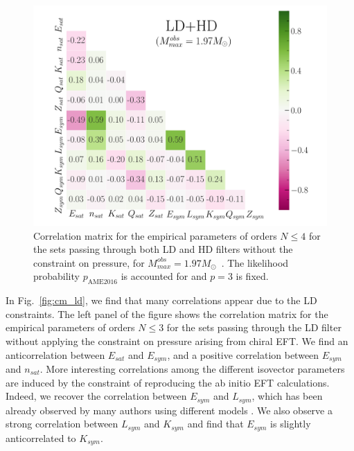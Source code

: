 \begin{figure}[!t]
\begin{center}
  \includegraphics[width=0.9\linewidth]{figures/cm_ldhd.pdf}
\end{center}
\caption[Correlations among empirical parameters for the sets passing through
both low-density and high-density filters]{Correlation matrix for the empirical 
  parameters of orders $N \leq 4$ for the sets passing through both LD and HD 
  filters without the constraint on pressure, for 
  $M_{max}^{obs}=1.97M_\odot$~\cite{Antoniadis2013}. The likelihood probability 
$p_{\text{AME2016}}$ is accounted for and $p=3$ is fixed.}\label{fig:cm_ldhd}
\end{figure}
 
In Fig.~\ref{fig:cm_ld}, we find that many correlations appear due to the LD 
constraints. The left panel of the figure shows the correlation matrix for the 
empirical parameters of orders $N \leq 3$ for the sets passing through the LD 
filter without applying the constraint on pressure arising from chiral EFT. We 
find an anticorrelation between $E_{sat}$ and $E_{sym}$, and a positive 
correlation between $E_{sym}$ and $n_{sat}$. More interesting correlations 
among the different isovector parameters are induced by the constraint of 
reproducing the ab initio EFT calculations. Indeed, we recover the correlation 
between $E_{sym}$ and $L_{sym}$, which has been already observed by many 
authors using different models 
\cite{Lim2019tidal,Kortelainen2012,Danielewicz2014,Trippa2008,Colo2014}.
We also observe a strong correlation between $L_{sym}$ and $K_{sym}$ and find
that $E_{sym}$ is slightly anticorrelated to $K_{sym}$.

